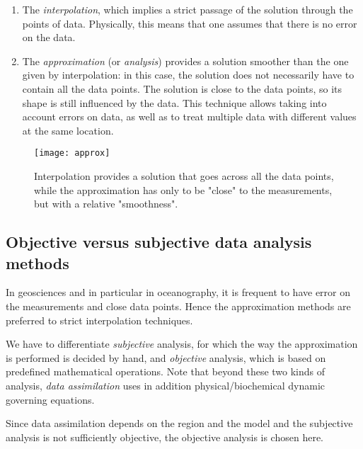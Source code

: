 \begin{enumerate}

\item The \textit{interpolation}, which implies a strict passage of the solution through the points of data. Physically, this means that one assumes that there is no error on the data. 


\item The \textit{approximation} (or \textit{analysis}) provides a solution smoother than the one given by interpolation: in this case, the solution does not necessarily have to contain all the data points. The solution is close to the data points, so its shape is still influenced by the data. This technique allows taking into account errors on data, as well as to treat multiple data with different values at the same location. 
\end{enumerate}

\begin{figure}[htpb]
	\centering
	\parbox{.5\textwidth}{
		\texttt{[image: approx]}
		}\parbox{.5\textwidth}{
		\caption{Interpolation provides a solution that goes across all the data points, while the approximation has only to be "close" to the measurements, but with a relative "smoothness".}
		}
\end{figure}


\subsection{Objective versus subjective data analysis methods\label{sec:gridding}}

In geosciences and in particular in oceanography, it is frequent to have error on the measurements and close data points. Hence the approximation methods are preferred to strict interpolation techniques.

We have to differentiate \textit{subjective} analysis, for which the way the approximation is performed is decided by hand, and \textit{objective} analysis, which is based on predefined mathematical operations. Note that beyond these two kinds of analysis, \textit{data assimilation} uses in addition physical/biochemical dynamic governing equations. 

Since data assimilation depends on the region and the model and the subjective analysis is not sufficiently objective, the objective analysis is chosen here. 

